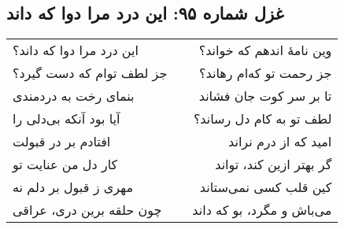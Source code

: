 \begin{center}
\section*{غزل شماره ۹۵: این درد مرا دوا که داند}
\label{sec:095}
\begin{longtable}{l p{0.5cm} r}
این درد مرا دوا که داند؟
&&
وین نامهٔ اندهم که خواند؟
\\
جز لطف توام که دست گیرد؟
&&
جز رحمت تو که‌ام رهاند؟
\\
بنمای رخت به دردمندی
&&
تا بر سر کوت جان فشاند
\\
آیا بود آنکه بی‌دلی را
&&
لطف تو به کام دل رساند؟
\\
افتادم بر در قبولت
&&
امید که از درم نراند
\\
کار دل من عنایت تو
&&
گر بهتر ازین کند، تواند
\\
مهری ز قبول بر دلم نه
&&
کین قلب کسی نمی‌ستاند
\\
چون حلقه برین دری، عراقی
&&
می‌باش و مگرد، بو که داند
\\
\end{longtable}
\end{center}
